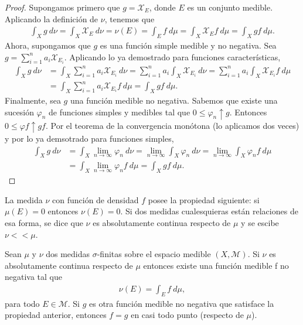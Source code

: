 \begin{proof}
    Supongamos primero que $g = \mathcal{X}_E$, donde $E$ es un conjunto medible. Aplicando la definición de $\nu$, tenemos que
    \begin{align*}
        \int_{X}{g \ d\nu} = \int_{X}{\mathcal{X}_E \ d\nu} = \nu(E)  = \int_{E}{f \ d\mu} = \int_{X}{\mathcal{X}_Ef \ d\mu} = \int_{X}{gf \ d\mu}.
    \end{align*}
    Ahora, supongamos que $g$ es una función simple medible y no negativa. Sea $g = \sum_{i=1}^{n}{a_i \mathcal{X}_{E_i}}$. Aplicando lo ya demostrado para funciones características,
    \begin{align*}
        \int_{X}{g \ d\nu} & = \int_{X}{\sum_{i=1}^{n}{a_i \mathcal{X}_{E_i}} \ d\nu} = \sum_{i=1}^{n}{a_i \int_{X}{\mathcal{X}_{E_i}} \ d\nu} = \sum_{i=1}^{n}{a_i \int_{X}{\mathcal{X}_{E_i}f} \ d\mu} \\
                           & = \int_{X}{\sum_{i=1}^{n}{a_i\mathcal{X}_{E_i}f} \ d\mu} = \int_{X}{gf \ d\mu}.
    \end{align*}
    Finalmente, sea $g$ una función medible no negativa. Sabemos que existe una sucesión $\varphi_n$ de funciones simples y medibles tal que $0 \leq \varphi_n \uparrow g$. Entonces $0 \leq \varphi f \uparrow g f$. Por el teorema de la convergencia monótona (lo aplicamos dos veces) y por lo ya demsotrado para funciones simples,
    \begin{align*}
        \int_{X}{g \ d\nu} & = \int_{X}{\lim_{n \to \infty}{\varphi_n} \ d\nu} = \lim_{n \to \infty}{\int_{X}{\varphi_n} \ d\nu} = \lim_{n \to \infty}{\int_{X}{\varphi_n f \ d\mu}} \\
                           & = \int_{X}{\lim_{n \to \infty}{\varphi_nf} \ d\mu} = \int_{X}{gf \ d\mu}.
    \end{align*}
\end{proof}

\begin{obs}
    La medida $\nu$ con función de densidad $f$ posee la propiedad siguiente: si $\mu(E) = 0$ entonces $\nu(E) = 0$. Si dos medidas cualesquieras están relaciones de esa forma, se dice que $\nu$ es absolutamente continua respecto de $\mu$ y se escibe $\nu << \mu$.
\end{obs}

\begin{teo}
    Sean $\mu$ y $\nu$ dos medidas $\sigma$-finitas sobre el espacio medible $(X, \mathcal{M})$. Si $\nu$ es absolutamente continua respecto de $\mu$ entonces existe una función medible f no negativa tal que
    \begin{align*}
        \nu(E) = \int_{E}{f \ d\mu},
    \end{align*}
    para todo $E \in \mathcal{M}$. Si $g$ es otra función medible no negativa que satisface la propiedad anterior, entonces $f = g$ en casi todo punto (respecto de $\mu$).
\end{teo}

